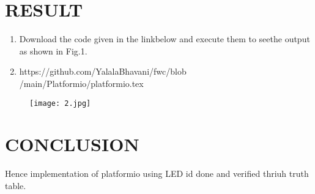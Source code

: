 \documentclass[conference]{IEEEtran}
\begin{document}
    \section{RESULT}                                  
    \begin{enumerate}
          \item Download the code given in the linkbelow     and execute them to seethe output as shown in Fig.1.
          \item https://github.com/YalalaBhavani/fwc/blob    /main/Platformio/platformio.tex
  \end{enumerate}
 
 \begin{figure}[h]
      \centering                                             \texttt{[image: 2.jpg]}
 \caption{\label{fig-5:Gates}}                   
\end{figure}
  \section{CONCLUSION}
 Hence implementation of platformio using LED id done and verified thriuh truth table.                                                                                               
\end{document}
